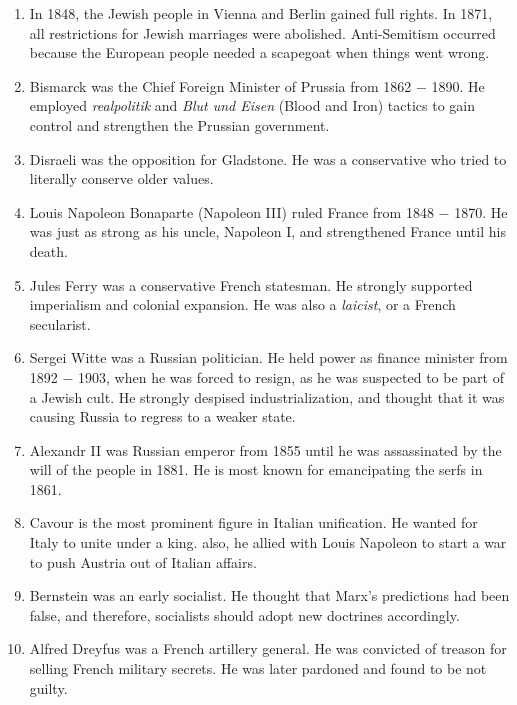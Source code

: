 \documentclass[12pt]{article}
\begin{document}
\begin{enumerate}
\item In 1848, the Jewish people in Vienna and Berlin gained full rights. In 1871, all restrictions for Jewish marriages were abolished. Anti-Semitism occurred because the European people needed a scapegoat when things went wrong.

\item Bismarck was the Chief Foreign Minister of Prussia from 1862 $-$ 1890. He employed \emph{realpolitik} and \emph{Blut und Eisen} (Blood and Iron) tactics to gain control and strengthen the Prussian government.

\item  Disraeli was the opposition for Gladstone. He was a conservative who tried to literally conserve older values.

\item Louis Napoleon Bonaparte (Napoleon III) ruled France from 1848 $-$ 1870. He was just as strong as his uncle, Napoleon I, and strengthened France until his death.

\item Jules Ferry was a conservative French statesman. He strongly supported imperialism and colonial expansion. He was also a \textit{laicist}, or a French secularist.

\item Sergei Witte was a Russian politician. He held power as finance minister from 1892 $-$ 1903, when he was forced to resign, as he was suspected to be part of a Jewish cult. He strongly despised industrialization, and thought that it was causing Russia to regress to a weaker state.

\item Alexandr II was Russian emperor from 1855 until he was assassinated by the will of the people in 1881. He is most known for emancipating the serfs in 1861.

\item Cavour is the most prominent figure in Italian unification. He wanted for Italy to unite under a king. also, he allied with Louis Napoleon to start a war to push Austria out of Italian affairs.

\item Bernstein was an early socialist. He thought that Marx's predictions had been false, and therefore, socialists should adopt new doctrines accordingly.

\item Alfred Dreyfus was a French artillery general. He was convicted of treason for selling French military secrets. He was later pardoned and found to be not guilty.


\end{enumerate}
\end{document}
